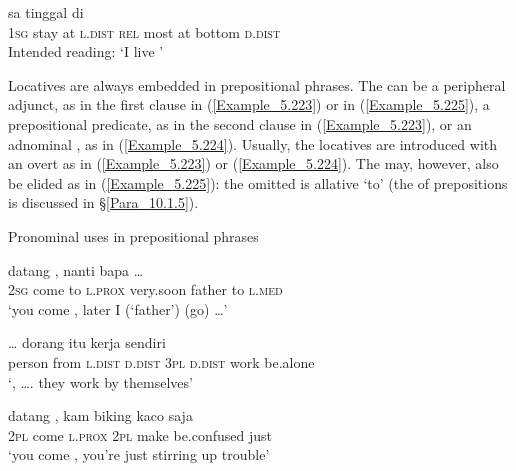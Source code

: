 \ex
\label{Example_5.222c}
 \gll {*}  {sa}  {tinggal}  {di}            \\
  {  }   \textsc{1sg}  stay  at  \textsc{l.dist}  \textsc{rel}  most  at  bottom  \textsc{d.dist}\\
\glt Intended reading: ‘I live ’ \textstyleExampleSource{[Elicited FS120314-001.010]}\\
\z
\z



Locatives are always embedded in prepositional phrases. The  can be a peripheral adjunct, as in the first clause in (\ref{Example_5.223}) or in (\ref{Example_5.225}), a prepositional predicate, as in the second clause in (\ref{Example_5.223}), or an adnominal , as in (\ref{Example_5.224}). Usually, the locatives are introduced with an overt  as in (\ref{Example_5.223}) or (\ref{Example_5.224}). The  may, however, also be elided as in (\ref{Example_5.225}): the omitted  is allative  ‘to’ (the  of prepositions is discussed in §\ref{Para_10.1.5}).


\begin{styleExampleTitle}
Pronominal uses in prepositional phrases
\end{styleExampleTitle}

\ea
\label{Example_5.223}
 {datang} {} {,} {nanti} {bapa} {} {} {{\ldots}}\\ %
 \textsc{2sg}  come  to  \textsc{l.prox}  very.soon  father  to  \textsc{l.med}  \\
\glt 
‘you come , later I (‘father’) (go)  {\ldots}’ \textstyleExampleSource{[080922-001a-CvPh.0462]}
\z

\ea
\label{Example_5.224}
 {} {} {} {{\ldots}} {dorang} {itu} {kerja} {sendiri}\\ %
 person  from  \textsc{l.dist}  \textsc{d.dist}   {}  \textsc{3pl}  \textsc{d.dist}  work  be.alone\\
\glt  ‘, {\ldots}. they work by themselves’ \textstyleExampleSource{[081014-007-CvEx.0050]}
\z

\ea
\label{Example_5.225}
 {datang} {} {,} {kam} {biking} {kaco} {saja}\\ %
 \textsc{2pl}  come   {}  \textsc{l.prox}  \textsc{2pl}  make  be.confused  just\\
\glt ‘you come , you’re just stirring up trouble’ \textstyleExampleSource{[081025-007-Cv.0013]}
\z



